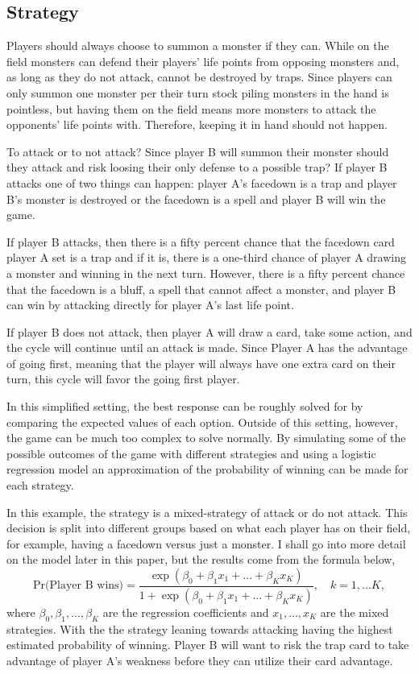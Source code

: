 \subsection{Strategy}
Players should always choose to summon a monster if they can. While on the field monsters can defend their players' life points from opposing monsters and, as long as they do not attack, cannot be destroyed by traps. Since players can only summon one monster per their turn stock piling monsters in the hand is pointless, but having them on the field means more monsters to attack the opponents' life points with. Therefore, keeping it in hand should not happen.

To attack or to not attack? Since player B will summon their monster should they attack and risk loosing their only defense to a possible trap? If player B attacks one of two things can happen: player A's facedown is a trap and player B's monster is destroyed or the facedown is a spell and player B will win the game.

If player B attacks, then there is a fifty percent chance that the facedown card player A set is a trap and if it is, there is a one-third chance of player A drawing a monster and winning in the next turn. However, there is a fifty percent chance that the facedown is a bluff, a spell that cannot affect a monster, and player B can win by attacking directly for player A's last life point.

If player B does not attack, then player A will draw a card, take some action, and the cycle will continue until an attack is made. Since Player A has the advantage of going first, meaning that the player will always have one extra card on their turn, this cycle will favor the going first player.

In this simplified setting, the best response can be roughly solved for by comparing the expected values of each option. Outside of this setting, however, the game can be much too complex to solve normally. By simulating some of the possible outcomes of the game with different strategies and using a logistic regression model an approximation of the probability of winning can be made for each strategy. 

In this example, the strategy is a mixed-strategy of attack or do not attack. This decision is split into different groups based on what each player has on their field, for example, having a facedown versus just a monster. I shall go into more detail on the model later in this paper, but the results come from the formula below,
$$ \text{Pr(Player B wins)} = \frac{\exp(\beta_0 + \beta_1 x_1 + ... + \beta_K x_K)}{1 + \exp(\beta_0 + \beta_1 x_1 + ... + \beta_K x_K)}, \quad k=1,...K , $$
where $\beta_0, \beta_1, ..., \beta_K$ are the regression coefficients and $x_1,..., x_K$ are the mixed strategies. With the the strategy leaning towards attacking having the highest estimated probability of winning. Player B will want to risk the trap card to take advantage of player A's weakness before they can utilize their card advantage.



